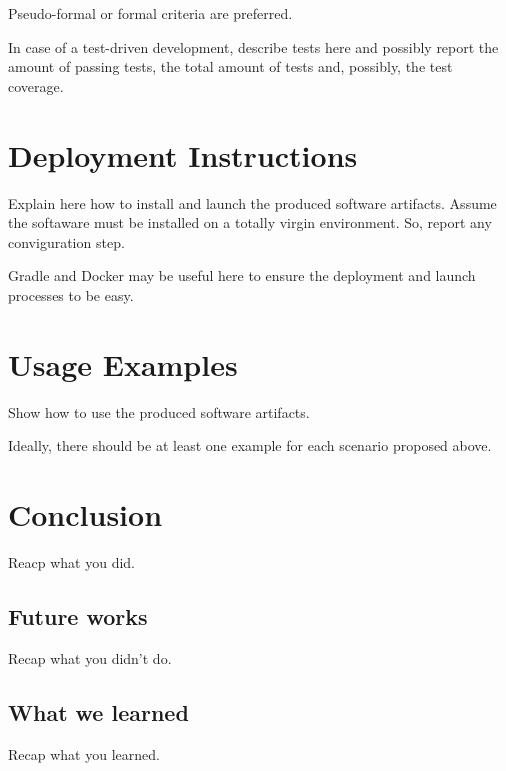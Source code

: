 \documentclass[12pt,a4paper,oneside,article]{article}
\begin{document}
		Pseudo-formal or formal criteria are preferred.
		
		In case of a test-driven development, describe tests here and possibly report the amount of passing tests, the total amount of tests and, possibly, the test coverage.
		
	\section{Deployment Instructions}
		Explain here how to install and launch the produced software artifacts. Assume the softaware must be installed on a totally virgin environment. So, report any conviguration step.
		
		Gradle and Docker may be useful here to ensure the deployment and launch processes to be easy.
		
	\section{Usage Examples}
		Show how to use the produced software artifacts.
		
		Ideally, there should be at least one example for each scenario proposed above.
		
	\section{Conclusion}
		Reacp what you did.
		
		\subsection{Future works}
			Recap what you didn't do.
		
		\subsection{What we learned}
			Recap what you learned.
\end{document}
